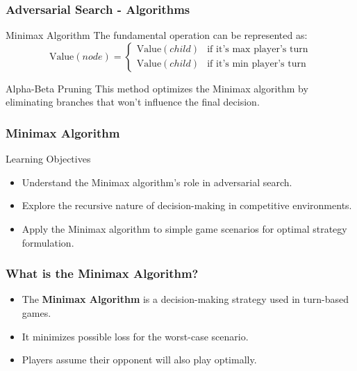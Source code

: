 \documentclass[aspectratio=169]{beamer}
\begin{document}
\begin{frame}[fragile]
    \frametitle{Adversarial Search - Algorithms}
    \begin{block}{Minimax Algorithm}
        The fundamental operation can be represented as:
        \begin{equation}
        \text{Value}(node) = \begin{cases} 
        \text{Value}(child) & \text{if it's max player's turn} \\ 
        \text{Value}(child) & \text{if it's min player's turn} 
        \end{cases}
        \end{equation}
    \end{block}
    \begin{block}{Alpha-Beta Pruning}
        This method optimizes the Minimax algorithm by eliminating branches that won't influence the final decision.
    \end{block}
\end{frame}

\begin{frame}
    \frametitle{Minimax Algorithm}
    \begin{block}{Learning Objectives}
        \begin{itemize}
            \item Understand the Minimax algorithm's role in adversarial search.
            \item Explore the recursive nature of decision-making in competitive environments.
            \item Apply the Minimax algorithm to simple game scenarios for optimal strategy formulation.
        \end{itemize}
    \end{block}
\end{frame}

\begin{frame}
    \frametitle{What is the Minimax Algorithm?}
    \begin{itemize}
        \item The \textbf{Minimax Algorithm} is a decision-making strategy used in turn-based games.
        \item It minimizes possible loss for the worst-case scenario.
        \item Players assume their opponent will also play optimally.
    \end{itemize}
\end{frame}
\end{document}
